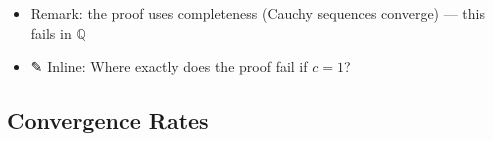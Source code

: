 \documentclass[
  10pt,
  letterpaper,
]{scrbook}
\providecommand{\tightlist}{%
  \setlength{\itemsep}{0pt}\setlength{\parskip}{0pt}}
\newcommand{\QQ}{\mathbb{Q}}
\begin{document}
\begin{itemize}
\begin{itemize}
    \begin{itemize}
    \tightlist
    \item
      Suppose \(L\) and \(M\) are both fixed points
    \item
      Then \(|L - M| = |f(L) - f(M)| \leq c|L - M|\)
    \item
      Since \(c < 1\), this forces \(|L - M| = 0\), so \(L = M\)
    \end{itemize}
  \end{itemize}
\item
  Remark: the proof uses completeness (Cauchy sequences converge) ---
  this fails in \(\QQ\)
\item
  ✎ Inline: Where exactly does the proof fail if \(c = 1\)?
\end{itemize}

\subsection{Convergence Rates}\label{convergence-rates}
\end{document}
